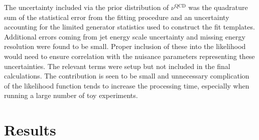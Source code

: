 The uncertainty included via the prior distribution of $\nu^{\textrm{QCD}}$ was
the quadrature sum of the statistical error from the fitting procedure and an
uncertainty accounting for the limited generator statistics used to construct
the fit templates. Additional errors coming from jet energy scale uncertainty
and missing energy resolution were found to be small. Proper inclusion of these
into the likelihood would need to ensure correlation with the nuisance
parameters representing these uncertainties. The relevant terms were setup but
not included in the final calculations. The contribution is seen to be small and
unnecessary complication of the likelihood function tends to increase the
processing time, especially when running a large number of toy experiments.


\section{Results}
\begin{figure}
\centering
{}\quad
{}\\
\quad
{}
\caption[]{}
\label{fig:pl}
\end{figure}

\begin{figure}
\centering
{}\quad
{}\\
\quad
{}\\
\caption[]{}
\label{fig:cls1}
\end{figure}

